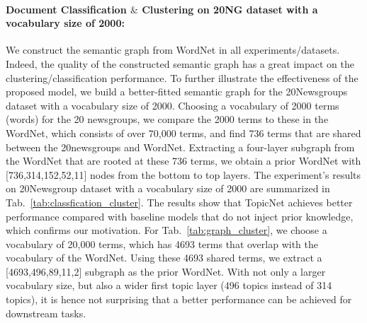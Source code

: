 \documentclass{article}
\begin{document}
\paragraph{Document Classification $\&$ Clustering on 20NG dataset with a vocabulary size of 2000:} We construct the semantic graph from WordNet in all experiments/datasets. Indeed, the quality of the constructed semantic graph has a great impact on the clustering/classification performance. To further illustrate the effectiveness of the proposed model, we build a better-fitted semantic graph for the 20Newsgroups dataset with a vocabulary size of 2000. 
Choosing a vocabulary of 2000 terms (words) for the 20 newsgroups, we compare the 2000 terms to these in the WordNet, which consists of over 70,000 terms, and find 736 terms that are shared between the 20newsgroups and WordNet. Extracting a four-layer subgraph from the WordNet that are rooted at these 736 terms, we obtain a prior WordNet with [736,314,152,52,11] nodes from the bottom to top layers. The  experiment’s results on 20Newsgroup dataset with a vocabulary size of 2000 are summarized in Tab.~\ref{tab:classfication_cluster}. The results show that TopicNet achieves better performance compared with baseline models that do not inject prior knowledge, which confirms our motivation. 
For Tab.~\ref{tab:graph_cluster}, we choose a vocabulary of 20,000 terms, which has 4693 terms that overlap with the vocabulary of the WordNet. Using these 4693 shared terms, we extract a [4693,496,89,11,2] subgraph as the prior WordNet. With not only a larger vocabulary size, but also a wider first topic layer (496 topics instead of 314 topics), it is hence not surprising that a better performance can be achieved for downstream tasks.
\end{document}
